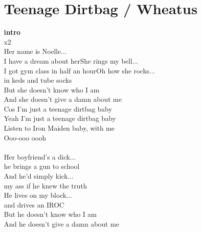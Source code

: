 \section{Teenage Dirtbag / Wheatus}\label{sec:teenagedirtbag}
\Cmajor
\BflatMajor
\Dminor
\DminorSeven
\DminorSix
\Fmajor
\Gseven



\textbf{intro}    \\
   x2\\
Her name is Noelle... \\
I have a dream about herShe rings my bell... \\
I got gym class in half an hourOh how she rocks...\\
in keds and tube socks\\
But she doesn’t know who I am \\
And she doesn’t give a damn about me\\
Cos I’m just a teenage dirtbag baby \\
Yeah I’m just a teenage dirtbag baby \\
Listen to Iron Maiden baby, with me \\
Ooo-ooo oooh \\
 \\
Her boyfriend’s a dick... \\
he brings a gun to school\\
And he’d simply kick... \\
my ass if he knew the truth\\
He lives on my block... \\
and drives an IROC\\
But he doesn’t know who I am \\
And he doesn’t give a damn about me\\
